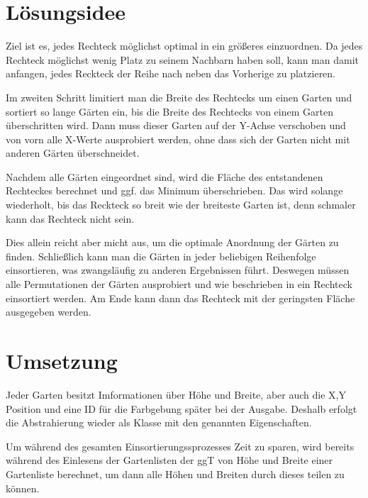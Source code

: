 \documentclass[a4paper,10pt,ngerman]{scrartcl}
\title{\Aufgabe}
\author{\Name\\Team-ID: \TeamId}
\date{\today}
\begin{document}
\maketitle
\vspace{7\baselineskip}
\tableofcontents
\pagebreak

\section{Lösungsidee}
\vspace{1\baselineskip}
Ziel ist es, jedes Rechteck möglichst optimal in ein größeres einzuordnen. Da jedes Rechteck möglichst wenig Platz zu seinem Nachbarn haben soll, kann man damit anfangen, jedes Reckteck der Reihe nach neben das Vorherige zu platzieren.

Im zweiten Schritt limitiert man die Breite des Rechtecks um einen Garten und sortiert so lange Gärten ein, bis die Breite des Rechtecks von einem Garten überschritten wird. Dann muss dieser Garten auf der Y-Achse verschoben und von vorn alle X-Werte ausprobiert werden, ohne dass sich der Garten nicht mit anderen Gärten überschneidet.

Nachdem alle Gärten eingeordnet sind, wird die Fläche des entstandenen Rechteckes berechnet und ggf. das Minimum überschrieben. Das wird solange wiederholt, bis das Reckteck so breit wie der breiteste Garten ist, denn schmaler kann das Rechteck nicht sein.

Dies allein reicht aber micht aus, um die optimale Anordnung der Gärten zu finden. Schließlich kann man die Gärten in jeder beliebigen Reihenfolge einsortieren, was zwangsläufig zu anderen Ergebnissen führt. Deswegen müssen alle Permutationen der Gärten ausprobiert und wie beschrieben in ein Rechteck einsortiert werden. Am Ende kann dann das Rechteck mit der geringsten Fläche ausgegeben werden.


\pagebreak
\section{Umsetzung}

Jeder Garten besitzt Imformationen über Höhe und Breite, aber auch die X,Y Position und eine ID für die Farbgebung später bei der Ausgabe. Deshalb erfolgt die Abstrahierung wieder als Klasse mit den genannten Eigenschaften.

Um während des gesamten Einsortierungssprozesses Zeit zu sparen, wird bereits während des Einlesens der Gartenlisten der ggT von Höhe und Breite einer Gartenliste berechnet, um dann alle Höhen und Breiten durch dieses teilen zu können.
\end{document}
